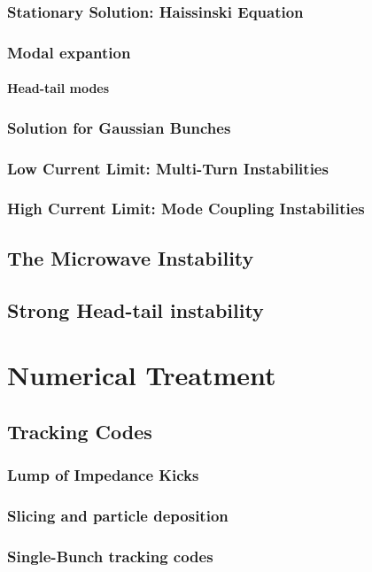 \subsubsection{Stationary Solution: Haissinski Equation}
\subsubsection{Modal expantion}
\paragraph{Head-tail modes}
\subsubsection{Solution for Gaussian Bunches}
\subsubsection{Low Current Limit: Multi-Turn Instabilities}
\subsubsection{High Current Limit: Mode Coupling Instabilities}
\subsection{The Microwave Instability}
\subsection{Strong Head-tail instability}
\section{Numerical Treatment}
\subsection{Tracking Codes}
\subsubsection{Lump of Impedance Kicks}
\subsubsection{Slicing and particle deposition}
\subsubsection{Single-Bunch tracking codes}
